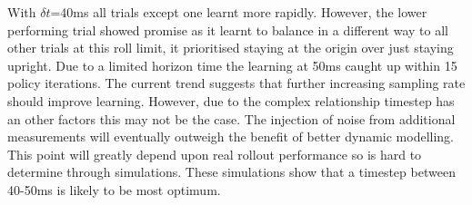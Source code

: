 \documentclass[twoside,twocolumn,12pt]{article}
\begin{document}
\newline
With $\delta t$=40ms all trials except one learnt more rapidly. However, the lower performing trial showed promise as it learnt to balance in a different way to all other trials at this roll limit, it prioritised staying at the origin over just staying upright. Due to a limited horizon time the learning at 50ms caught up within 15 policy iterations.
\newline
The current trend suggests that further increasing sampling rate should improve learning. However, due to the complex relationship timestep has an other factors this may not be the case. The injection of noise from additional measurements will eventually outweigh the benefit of better dynamic modelling. This point will greatly depend upon real rollout performance so is hard to determine through simulations.
\newline
These simulations show that a timestep between 40-50ms is likely to be most optimum.  



\end{document}
